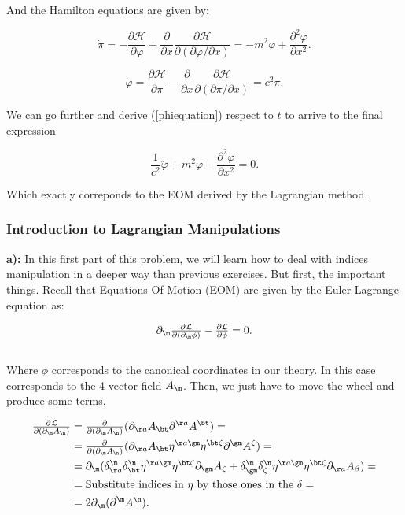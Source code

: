 And the Hamilton equations are given by:

\begin{equation}
	\dot{\pi}=-\frac{\partial \mathcal{H}}{\partial \varphi}+\frac{\partial}{\partial x} \frac{\partial \mathcal{H}}{\partial(\partial \varphi / \partial x)}=-m^{2} \varphi+\frac{\partial^{2} \varphi}{\partial x^{2}}.
\end{equation}

\begin{equation}\label{phiequation}
	\dot{\varphi}=\frac{\partial \mathcal{H}}{\partial \pi}-\frac{\partial}{\partial x} \frac{\partial \mathcal{H}}{\partial(\partial \pi / \partial x)}=c^{2} \pi .
\end{equation}

We can go further and derive (\ref{phiequation}) respect to $t$ to arrive to the final expression

\begin{equation}
	\frac{1}{c^{2}} \ddot{\varphi}+m^{2} \varphi-\frac{\partial^{2} \varphi}{\partial x^{2}} =0.
\end{equation}

Which exactly correponds to the EOM derived by the Lagrangian method.

\subsubsection{Introduction to Lagrangian Manipulations}\label{Introduction to Lagrangian Manipulations}

\textbf{a):}
In this first part of this problem, we will learn how to deal with indices manipulation in a deeper way than previous exercises. But first, the important things. Recall that Equations Of Motion (EOM) are given by the Euler-Lagrange equation as:

\begin{equation}
	\pd{\m}\tfrac{\pu{}\matL}{\partial (\pd{\m}\phi)} - \tfrac{\pd{}\matL}{\partial \phi} = 0.
\end{equation}\\
Where $\phi$ corresponds to the canonical coordinates in our theory. In this case corresponds to the 4-vector field $A_{\m}$. Then, we just have to move the wheel and produce some terms.

\begin{equation}
	\begin{split}
		\tfrac{\pu{}\matL}{\partial (\pd{\m}A_{\n})} &= \tfrac{\pu{}}{\partial (\pd{\m}A_{\n})} (\pd{\aa}\vad{\bt} \pu{\aa}\vau{\bt})=\\
		&=  \tfrac{\pu{}}{\partial (\pd{\m}A_{\n})} (\pd{\aa}\vad{\bt} \metu{\aa\gm}\metu{\bt\zeta}\pu{\gm}\vau{\zeta})=\\
		&= \pd{\m} (\deltita{\m}{\aa}\deltita{\n}{\bt} \metu{\aa\gm}\metu{\bt\zeta} \pd{\gm}\vad{\zeta} +\deltita{\m}{\gm}\deltita{\n}{\zeta} \metu{\aa\gm}\metu{\bt\zeta} \pd{\aa}\vad{\beta})=\\
		& = \text{Substitute indices in $\eta$ by those ones in the $\delta$} =\\
		&= 2 \pd{\m} (\pu{\m}\vau{\n}).
	\end{split}
\end{equation}

